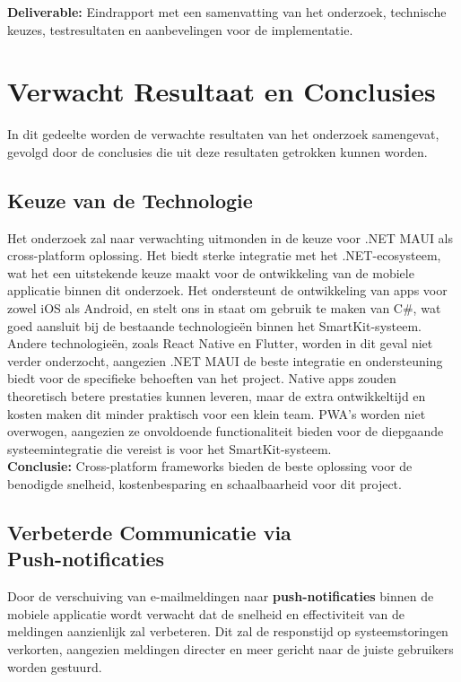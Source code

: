 \noindent \textbf{Deliverable:} Eindrapport met een samenvatting van het onderzoek, technische keuzes, testresultaten en aanbevelingen voor de implementatie.



\section{Verwacht Resultaat en Conclusies}
\label{sec:verwachte_resultaten}

\noindent In dit gedeelte worden de verwachte resultaten van het onderzoek samengevat, gevolgd door de conclusies die uit deze resultaten getrokken kunnen worden.

\subsection{Keuze van de Technologie}
\noindent Het onderzoek zal naar verwachting uitmonden in de keuze voor .NET MAUI als cross-platform oplossing. Het biedt sterke integratie met het .NET-ecosysteem, wat het een uitstekende keuze maakt voor de ontwikkeling van de mobiele applicatie binnen dit onderzoek. Het ondersteunt de ontwikkeling van apps voor zowel iOS als Android, en stelt ons in staat om gebruik te maken van C#, wat goed aansluit bij de bestaande technologieën binnen het SmartKit-systeem. Andere technologieën, zoals React Native en Flutter, worden in dit geval niet verder onderzocht, aangezien .NET MAUI de beste integratie en ondersteuning biedt voor de specifieke behoeften van het project. Native apps zouden theoretisch betere prestaties kunnen leveren, maar de extra ontwikkeltijd en kosten maken dit minder praktisch voor een klein team. PWA's worden niet overwogen, aangezien ze onvoldoende functionaliteit bieden voor de diepgaande systeemintegratie die vereist is voor het SmartKit-systeem.\\


\noindent \textbf{Conclusie:} Cross-platform frameworks bieden de beste oplossing voor de benodigde snelheid, kostenbesparing en schaalbaarheid voor dit project.

\subsection{Verbeterde Communicatie via \\Push-notificaties}
\noindent Door de verschuiving van e-mailmeldingen naar \textbf{push-notificaties} binnen de mobiele applicatie wordt verwacht dat de snelheid en effectiviteit van de meldingen aanzienlijk zal verbeteren. Dit zal de responstijd op systeemstoringen verkorten, aangezien meldingen directer en meer gericht naar de juiste gebruikers worden gestuurd.\\



